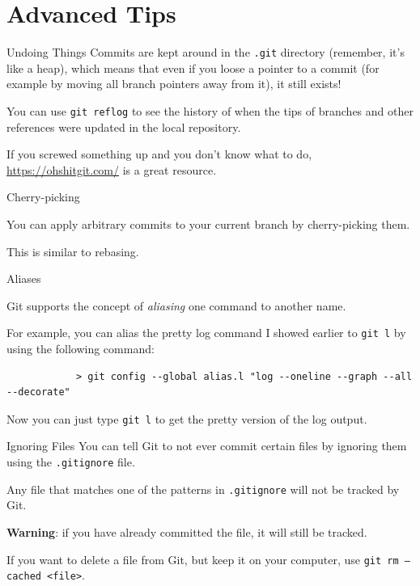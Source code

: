 \documentclass{beeper}
\begin{document}
\section{Advanced Tips}

\begin{frame}{Undoing Things}
    Commits are kept around in the \texttt{.git} directory (remember, it's like
    a heap), which means that even if you loose a pointer to a commit (for
    example by moving all branch pointers away from it), it still exists!

    You can use \texttt{git reflog} to see the history of when the tips of
    branches and other references were updated in the local repository.
    \pause

    If you screwed something up and you don't know what to do,
    \url{https://ohshitgit.com/} is a great resource.
\end{frame}

\begin{frame}{Cherry-picking}

    You can apply arbitrary commits to your current branch by cherry-picking
    them.

    This is similar to rebasing.

\end{frame}

\begin{frame}[fragile]{Aliases}

    Git supports the concept of \textit{aliasing} one command to another name.

    For example, you can alias the pretty log command I showed earlier to
    \texttt{git l} by using the following command:
    {
        \scriptsize
        \begin{verbatim}
            > git config --global alias.l "log --oneline --graph --all --decorate"
        \end{verbatim}
    }

    Now you can just type \texttt{git l} to get the pretty version of the log
    output.
\end{frame}

\begin{frame}{Ignoring Files}
    You can tell Git to not ever commit certain files by ignoring them using the \texttt{.gitignore} file.

    Any file that matches one of the patterns in \texttt{.gitignore} will not be
    tracked by Git.
    \pause

    \textbf{Warning}: if you have already committed the file, it will still be
    tracked.

    If you want to delete a file from Git, but keep it on your computer, use
    \texttt{git rm --cached <file>}.
\end{frame}
\end{document}
